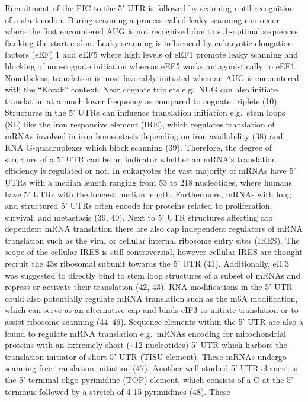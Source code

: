 \documentclass[12pt,openany]{book}
\begin{document}
Recruitment of the PIC to the 5' UTR is followed by scanning until
recognition of a start codon. During scanning a process called leaky
scanning can occur where the first encountered AUG is not recognized due
to sub-optimal sequences flanking the start codon. Leaky scanning is
influenced by eukaryotic elongation factors (eEF) 1 and eEF5 where high
levels of eEF1 promote leaky scanning and blocking of non-cognate
initiation whereas eEF5 works antagonistically to eEF1. Nonetheless,
translation is most favorably initiated when an AUG is encountered with
the ``Kozak'' context. Near cognate triplets e.g.~NUG can also initiate
translation at a much lower frequency as compared to cognate triplets
(10). Structures in the 5' UTRs can influence translation initiation
e.g.~stem loops (SL) like the iron responsive element (IRE), which
regulates translation of mRNAs involved in iron homeostasis depending on
iron availability (38) and RNA G-quadruplexes which block scanning (39).
Therefore, the degree of structure of a 5' UTR can be an indicator
whether an mRNA's translation efficiency is regulated or not. In
eukaryotes the vast majority of mRNAs have 5' UTRs with a median length
ranging from 53 to 218 nucleotides, where humans have 5' UTRs with the
longest median length. Furthermore, mRNAs with long and structured 5'
UTRs often encode for proteins related to proliferation, survival, and
metastasis (39, 40). Next to 5' UTR structures affecting cap dependent
mRNA translation there are also cap independent regulators of mRNA
translation such as the viral or cellular internal ribosome entry sites
(IRES). The scope of the cellular IRES is still controversial, however
cellular IRES are thought recruit the 43s ribosomal subunit towards the
5' UTR (41). Additionally, eIF3 was suggested to directly bind to stem
loop structures of a subset of mRNAs and repress or activate their
translation (42, 43). RNA modifications in the 5' UTR could also
potentially regulate mRNA translation such as the m6A modification,
which can serve as an alternative cap and binds eIF3 to initiate
translation or to assist ribosome scanning (44--46). Sequence elements
within the 5' UTR are also a found to regulate mRNA translation
e.g.~mRNAs encoding for mitochondrial proteins with an extremely short
(\textasciitilde{}12 nucleotides) 5' UTR which harbors the translation
initiator of short 5' UTR (TISU element). These mRNAs undergo scanning
free translation initiation (47). Another well-studied 5' UTR element is
the 5' terminal oligo pyrimidine (TOP) element, which consists of a C at
the 5' terminus followed by a stretch of 4-15 pyrimidines (48). These
\end{document}
